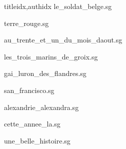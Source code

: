 \documentclass[
    ]{article}
\begin{document}
\begin{songs}{titleidx,authidx}
{le_soldat_belge.sg}


{terre_rouge.sg}


{au_trente_et_un_du_mois_daout.sg}


{les_trois_marins_de_groix.sg}


{gai_luron_des_flandres.sg}


{san_francisco.sg}


{alexandrie_alexandra.sg}


{cette_annee_la.sg}


{une_belle_histoire.sg}


\end{songs}
\end{document}
